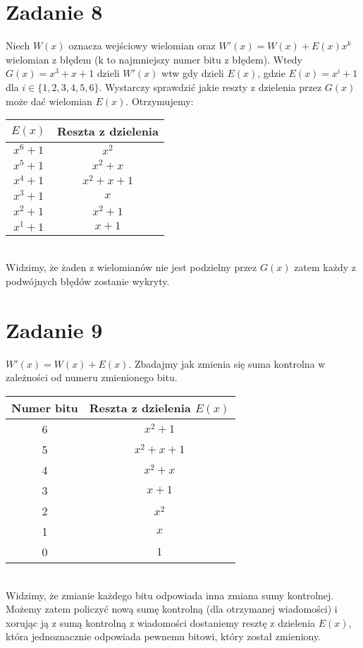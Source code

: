 \documentclass{article}
\begin{document}
\section{Zadanie 8}
Niech $W(x)$ oznacza wejściowy wielomian oraz $W'(x) = W(x) + E(x)x^k$ wielomian z błędem (k to najmniejszy numer bitu z błędem). Wtedy $G(x) = x^3 + x + 1$ dzieli $W'(x)$ wtw gdy dzieli $E(x)$, gdzie $E(x) = x^i + 1$ dla $i \in \{1,2,3,4,5,6\}$. Wystarczy sprawdzić jakie reszty z dzielenia przez $G(x)$ może dać wielomian $E(x)$. Otrzymujemy:\\
\begin{tabular}{c|c}
    $E(x)$ & Reszta z dzielenia\\ \hline
    $x^6 +1$ & $x^2$ \\
    $x^5 +1$ & $x^2 + x$ \\
    $x^4 +1$ & $x^2 + x + 1$ \\
    $x^3 +1$ & $x$ \\
    $x^2 +1$ & $x^2 + 1$ \\
    $x^1 +1$ & $x + 1$
\end{tabular}\\
Widzimy, że żaden z wielomianów nie jest podzielny przez $G(x)$ zatem każdy z podwójnych błędów zostanie wykryty.
\section{Zadanie 9}
$W'(x) = W(x) + E(x)$. Zbadajmy jak zmienia się suma kontrolna w zależności od numeru zmienionego bitu.\\
\begin{tabular}{c|c}
    Numer bitu & Reszta z dzielenia $E(x)$\\ \hline
    6 & $x^2 + 1$ \\
    5 & $x^2 + x + 1$ \\
    4 & $x^2 + x$ \\
    3 & $x+1$ \\
    2 & $x^2$ \\
    1 & $x$ \\
    0 & $1$
\end{tabular}\\
Widzimy, że zmianie każdego bitu odpowiada inna zmiana sumy kontrolnej. Możemy zatem policzyć nową sumę kontrolną (dla otrzymanej wiadomości) i xorując ją z sumą kontrolną z wiadomości dostaniemy resztę z dzielenia $E(x)$, która jednoznacznie odpowiada pewnemu bitowi, który został zmieniony.
\end{document}
